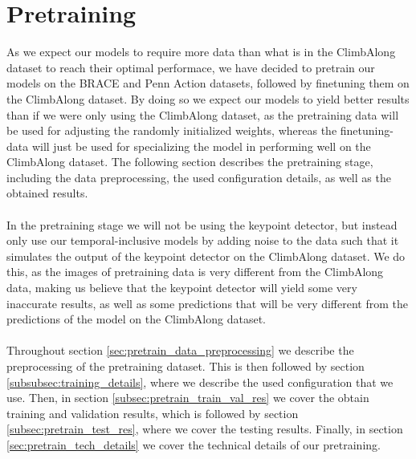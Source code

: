 \documentclass[./main.tex]{subfiles}
\begin{document}
\section{Pretraining}
\label{sec:pretraining}
As we expect our models to require more data than what is in the ClimbAlong dataset to reach their optimal performace, we have decided to pretrain our models on the BRACE and Penn Action datasets, followed by finetuning them on the ClimbAlong dataset. By doing so we expect our models to yield better results than if we were only using the ClimbAlong dataset, as the pretraining data will be used for adjusting the randomly initialized weights, whereas the finetuning-data will just be used for specializing the model in performing well on the ClimbAlong dataset. The following section describes the pretraining stage, including the data preprocessing, the used configuration details, as well as the obtained results.
\\
\\
In the pretraining stage we will not be using the keypoint detector, but instead only use our temporal-inclusive models by adding noise to the data such that it simulates the output of the keypoint detector on the ClimbAlong dataset. We do this, as the images of pretraining data is very different from the ClimbAlong data, making us believe that the keypoint detector will yield some very inaccurate results, as well as some predictions that will be very different from the predictions of the model on the ClimbAlong dataset.
\\
\\
Throughout section \ref{sec:pretrain_data_preprocessing} we describe the preprocessing of the pretraining dataset. This is then followed by section \ref{subsubsec:training_details}, where we describe the used configuration that we use. Then, in section \ref{subsec:pretrain_train_val_res} we cover the obtain training and validation results, which is followed by section \ref{subsec:pretrain_test_res}, where we cover the testing results. Finally, in section \ref{sec:pretrain_tech_details} we cover the technical details of our pretraining.
\end{document}
